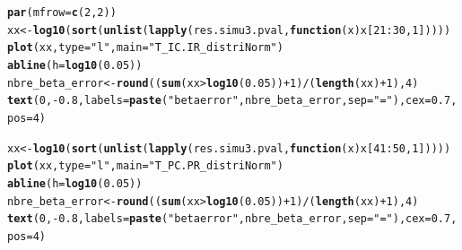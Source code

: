 \documentclass[12pt]{article}\usepackage[]{graphicx}\usepackage[]{color}
\makeatletter
\newcommand{\hlnum}[1]{\textcolor[rgb]{0.686,0.059,0.569}{#1}}%
\newcommand{\hlstr}[1]{\textcolor[rgb]{0.192,0.494,0.8}{#1}}%
\newcommand{\hlopt}[1]{\textcolor[rgb]{0,0,0}{#1}}%
\newcommand{\hlstd}[1]{\textcolor[rgb]{0.345,0.345,0.345}{#1}}%
\newcommand{\hlkwa}[1]{\textcolor[rgb]{0.161,0.373,0.58}{\textbf{#1}}}%
\newcommand{\hlkwb}[1]{\textcolor[rgb]{0.69,0.353,0.396}{#1}}%
\newcommand{\hlkwc}[1]{\textcolor[rgb]{0.333,0.667,0.333}{#1}}%
\newcommand{\hlkwd}[1]{\textcolor[rgb]{0.737,0.353,0.396}{\textbf{#1}}}%
\newenvironment{kframe}{%
 \def\at@end@of@kframe{}%
 \ifinner\ifhmode%
  \def\at@end@of@kframe{\end{minipage}}%
  \begin{minipage}{\columnwidth}%
 \fi\fi%
 \def\FrameCommand##1{\hskip\@totalleftmargin \hskip-\fboxsep
 \colorbox{shadecolor}{##1}\hskip-\fboxsep
     \hskip-\linewidth \hskip-\@totalleftmargin \hskip\columnwidth}%
 \MakeFramed {\advance\hsize-\width
   \@totalleftmargin\z@ \linewidth\hsize
   \@setminipage}}%
 {\par\unskip\endMakeFramed%
 \at@end@of@kframe}
\newenvironment{knitrout}{}{} %
\makeatother
\begin{document}
\begin{knitrout}\small
{}\color{fgcolor}\begin{kframe}
\begin{alltt}
\hlkwd{par}\hlstd{(}\hlkwc{mfrow} \hlstd{=} \hlkwd{c}\hlstd{(}\hlnum{2}\hlstd{,} \hlnum{2}\hlstd{))}
\hlstd{xx} \hlkwb{<-} \hlkwd{log10}\hlstd{(}\hlkwd{sort}\hlstd{(}\hlkwd{unlist}\hlstd{(}\hlkwd{lapply}\hlstd{(res.simu3.pval,} \hlkwa{function}\hlstd{(}\hlkwc{x}\hlstd{) x[}\hlnum{21}\hlopt{:}\hlnum{30}\hlstd{,} \hlnum{1}\hlstd{]))))}
\hlkwd{plot}\hlstd{(xx,} \hlkwc{type} \hlstd{=} \hlstr{"l"}\hlstd{,} \hlkwc{main} \hlstd{=} \hlstr{"T_IC.IR_distriNorm"}\hlstd{)}
\hlkwd{abline}\hlstd{(}\hlkwc{h} \hlstd{=} \hlkwd{log10}\hlstd{(}\hlnum{0.05}\hlstd{))}
\hlstd{nbre_beta_error} \hlkwb{<-} \hlkwd{round}\hlstd{((}\hlkwd{sum}\hlstd{(xx}\hlopt{>}\hlkwd{log10}\hlstd{(}\hlnum{0.05}\hlstd{))}\hlopt{+}\hlnum{1}\hlstd{)}\hlopt{/}\hlstd{(}\hlkwd{length}\hlstd{(xx)}\hlopt{+}\hlnum{1}\hlstd{),} \hlnum{4}\hlstd{)}
\hlkwd{text}\hlstd{(}\hlnum{0}\hlstd{,} \hlopt{-}\hlnum{0.8}\hlstd{,} \hlkwc{labels} \hlstd{=} \hlkwd{paste}\hlstd{(}\hlstr{"beta error"}\hlstd{, nbre_beta_error,} \hlkwc{sep} \hlstd{=} \hlstr{" = "}\hlstd{),} \hlkwc{cex} \hlstd{=} \hlnum{0.7}\hlstd{,} \hlkwc{pos} \hlstd{=} \hlnum{4}\hlstd{)}

\hlstd{xx} \hlkwb{<-} \hlkwd{log10}\hlstd{(}\hlkwd{sort}\hlstd{(}\hlkwd{unlist}\hlstd{(}\hlkwd{lapply}\hlstd{(res.simu3.pval,} \hlkwa{function}\hlstd{(}\hlkwc{x}\hlstd{) x[}\hlnum{41}\hlopt{:}\hlnum{50}\hlstd{,} \hlnum{1}\hlstd{]))))}
\hlkwd{plot}\hlstd{(xx,} \hlkwc{type} \hlstd{=} \hlstr{"l"}\hlstd{,} \hlkwc{main} \hlstd{=} \hlstr{"T_PC.PR_distriNorm"}\hlstd{)}
\hlkwd{abline}\hlstd{(}\hlkwc{h} \hlstd{=} \hlkwd{log10}\hlstd{(}\hlnum{0.05}\hlstd{))}
\hlstd{nbre_beta_error} \hlkwb{<-} \hlkwd{round}\hlstd{((}\hlkwd{sum}\hlstd{(xx}\hlopt{>}\hlkwd{log10}\hlstd{(}\hlnum{0.05}\hlstd{))}\hlopt{+}\hlnum{1}\hlstd{)}\hlopt{/}\hlstd{(}\hlkwd{length}\hlstd{(xx)}\hlopt{+}\hlnum{1}\hlstd{),} \hlnum{4}\hlstd{)}
\hlkwd{text}\hlstd{(}\hlnum{0}\hlstd{,} \hlopt{-}\hlnum{0.8}\hlstd{,} \hlkwc{labels} \hlstd{=} \hlkwd{paste}\hlstd{(}\hlstr{"beta error"}\hlstd{, nbre_beta_error,} \hlkwc{sep} \hlstd{=} \hlstr{" = "}\hlstd{),} \hlkwc{cex} \hlstd{=} \hlnum{0.7}\hlstd{,} \hlkwc{pos} \hlstd{=} \hlnum{4}\hlstd{)}



\end{alltt}
\end{kframe}
\end{knitrout}
\end{document}
